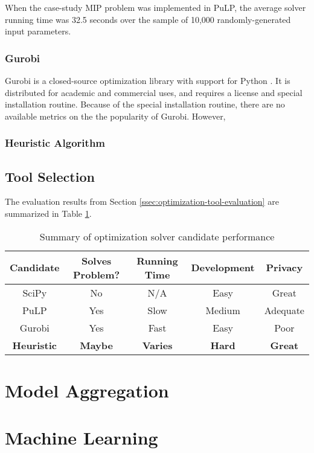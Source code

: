 \documentclass[../mthe-493-final-project.tex]{subfiles}
\begin{document}
    When the case-study MIP problem was implemented in PuLP, the average solver running time was 32.5 seconds over the sample of 10,000 randomly-generated input parameters.
    
    \subsubsection{Gurobi}
    \label{sssec:optimization-candidate-gurobi}
    
    Gurobi is a closed-source optimization library with support for Python \cite{gurobi}. It is distributed for academic and commercial uses, and requires a license and special installation routine. Because of the special installation routine, there are no available metrics on the the popularity of Gurobi. However, 
    
    \subsubsection{Heuristic Algorithm}
    \label{sssec:optimization-candidate-heuristic}
    
    \subsection{Tool Selection}
    \label{ssec:optimization-tool-selection}
    
    The evaluation results from Section \ref{ssec:optimization-tool-evaluation} are summarized in Table \ref{tab:optimization-tool-summary}.
    
    \begin{center}
    \begin{table}
    \begin{tabular}{| c || c c c c |}
        \hline
        Candidate & Solves Problem? & Running Time & Development & Privacy \\ [0.5ex] 
        \hline\hline
        SciPy & No & N/A & Easy & Great \\ 
        \hline
        PuLP & Yes & Slow & Medium & Adequate \\
        \hline
        Gurobi & Yes & Fast & Easy & Poor \\
        \hline
        \textbf{Heuristic} & \textbf{Maybe} & \textbf{Varies} & \textbf{Hard} & \textbf{Great} \\
        \hline
    \end{tabular}
    \caption{\label{tab:optimization-tool-summary}Summary of optimization solver candidate performance}
    \end{table}
    \end{center}
    
    \section{Model Aggregation}
    \label{sec:model-aggregation-engineering-tools}
    
    \section{Machine Learning}
    \label{sec:machine-learning-engineering-tools}
    
    
\end{document}
